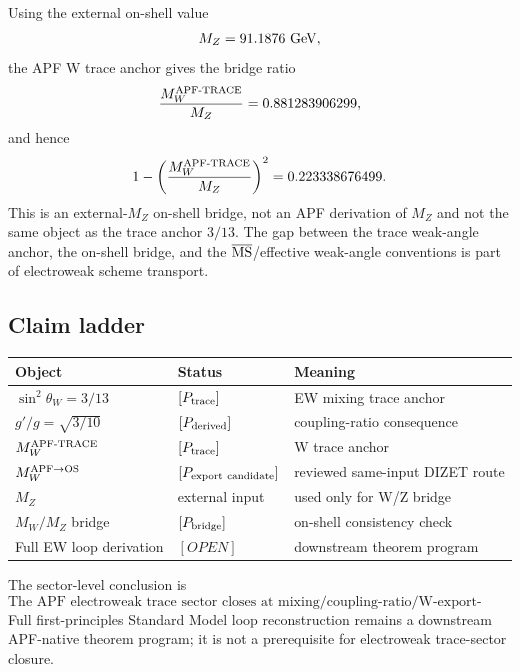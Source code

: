 Using the external on-shell value
\begin{equation}
  M_Z=91.1876\ {\rm GeV},
\end{equation}
the APF W trace anchor gives the bridge ratio
\begin{equation}
  \frac{M_W^{\rm APF\text{-}TRACE}}{M_Z}=0.881283906299,
\end{equation}
and hence
\begin{equation}
  1-\left(\frac{M_W^{\rm APF\text{-}TRACE}}{M_Z}\right)^2
  =0.223338676499.
\end{equation}
This is an external-\(M_Z\) on-shell bridge, not an APF derivation of \(M_Z\) and not the same object as the trace anchor \(3/13\).  The gap between the trace weak-angle anchor, the on-shell bridge, and the \(\overline{\rm MS}\)/effective weak-angle conventions is part of electroweak scheme transport.

\subsection{Claim ladder}

\begin{center}
\begin{tabular}{lll}
\hline
Object & Status & Meaning \\
\hline
\(\sin^2\theta_W=3/13\) & \([P_{\rm trace}]\) & EW mixing trace anchor \\
\(g'/g=\sqrt{3/10}\) & \([P_{\rm derived}]\) & coupling-ratio consequence \\
\(M_W^{\rm APF\text{-}TRACE}\) & \([P_{\rm trace}]\) & W trace anchor \\
\(M_W^{\rm APF\to OS}\) & \([P_{\rm export\ candidate}]\) & reviewed same-input DIZET route \\
\(M_Z\) & external input & used only for W/Z bridge \\
\(M_W/M_Z\) bridge & \([P_{\rm bridge}]\) & on-shell consistency check \\
Full EW loop derivation & \([OPEN]\) & downstream theorem program \\
\hline
\end{tabular}
\end{center}

The sector-level conclusion is
\begin{equation}
\boxed{\text{The APF electroweak trace sector closes at mixing/coupling-ratio/W-export-candidate level.}}
\end{equation}
Full first-principles Standard Model loop reconstruction remains a downstream APF-native theorem program; it is not a prerequisite for electroweak trace-sector closure.
